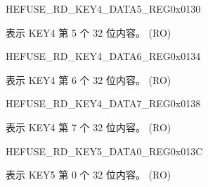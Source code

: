\begin{register}{H}{EFUSE\_RD\_KEY4\_DATA5\_REG}{0x{}0130}\label{regdesc:EFUSERDKEY4DATA5REG}
%
\regnewline%
\begin{regdesc}\begin{reglist}
\label{fielddesc:EFUSEKEY4DATA5}\item [EFUSE\_KEY4\_DATA5] 表示 KEY4 第 5 个 32 位内容。 (RO)
\end{reglist}\end{regdesc}
\end{register}


\begin{register}{H}{EFUSE\_RD\_KEY4\_DATA6\_REG}{0x{}0134}\label{regdesc:EFUSERDKEY4DATA6REG}
%
\regnewline%
\begin{regdesc}\begin{reglist}
\label{fielddesc:EFUSEKEY4DATA6}\item [EFUSE\_KEY4\_DATA6] 表示 KEY4 第 6 个 32 位内容。 (RO)
\end{reglist}\end{regdesc}
\end{register}


\begin{register}{H}{EFUSE\_RD\_KEY4\_DATA7\_REG}{0x{}0138}\label{regdesc:EFUSERDKEY4DATA7REG}
%
\regnewline%
\begin{regdesc}\begin{reglist}
\label{fielddesc:EFUSEKEY4DATA7}\item [EFUSE\_KEY4\_DATA7] 表示 KEY4 第 7 个 32 位内容。 (RO)
\end{reglist}\end{regdesc}
\end{register}


\begin{register}{H}{EFUSE\_RD\_KEY5\_DATA0\_REG}{0x{}013C}\label{regdesc:EFUSERDKEY5DATA0REG}
%
\regnewline%
\begin{regdesc}\begin{reglist}
\label{fielddesc:EFUSEKEY5DATA0}\item [EFUSE\_KEY5\_DATA0] 表示 KEY5 第 0 个 32 位内容。 (RO)
\end{reglist}\end{regdesc}
\end{register}


